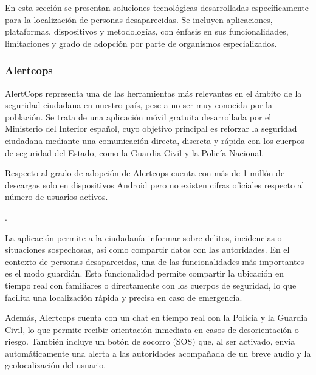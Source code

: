     En esta sección se presentan soluciones tecnológicas desarrolladas específicamente para la localización de personas desaparecidas. Se incluyen aplicaciones, plataformas, dispositivos y metodologías, con énfasis en sus funcionalidades, limitaciones y grado de adopción por parte de organismos especializados.

    \subsubsection{Alertcops}
    
    AlertCops representa una de las herramientas más relevantes en el ámbito de la seguridad ciudadana en nuestro país, pese a no ser muy conocida por la población. Se trata de una aplicación móvil gratuita desarrollada por el Ministerio del Interior español, cuyo objetivo principal es reforzar la seguridad ciudadana mediante una comunicación directa, discreta y rápida con los cuerpos de seguridad del Estado, como la Guardia Civil y la Policía Nacional.\cite{Alertcops} 
    
    Respecto al grado de adopción de Alertcops cuenta con más de 1 millón de descargas solo en dispositivos Android pero no existen cifras oficiales respecto al número de usuarios activos.\cite{AlertCopsPlayStore}
    
.

    La aplicación permite a la ciudadanía informar sobre delitos, incidencias o situaciones sospechosas, así como compartir datos con las autoridades. En el contexto de personas desaparecidas, una de las funcionalidades más importantes es el modo guardián. Esta funcionalidad permite compartir la ubicación en tiempo real con familiares o directamente con los cuerpos de seguridad, lo que facilita una localización rápida y precisa en caso de emergencia.


    Además, Alertcops cuenta con un chat en tiempo real con la Policía y la Guardia Civil, lo que permite recibir orientación inmediata en casos de desorientación o riesgo. También incluye un botón de socorro (SOS) que, al ser activado, envía automáticamente una alerta a las autoridades acompañada de un breve audio y la geolocalización del usuario. \cite{alertcops_folleto}

